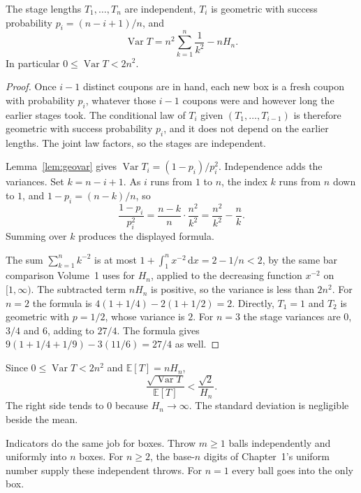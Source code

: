 \begin{proposition}\label{prop:couponvar}
The stage lengths $T_1,\ldots,T_n$ are independent, $T_i$ is geometric with success probability $p_i=(n-i+1)/n$, and
\[
 \operatorname{Var}T=n^2\sum_{k=1}^n\frac1{k^2}-nH_n.
\]
In particular $0\le\operatorname{Var}T<2n^2$.
\end{proposition}
\begin{proof}
Once $i-1$ distinct coupons are in hand, each new box is a fresh coupon with probability $p_i$, whatever those $i-1$ coupons were and however long the earlier stages took. The conditional law of $T_i$ given $(T_1,\ldots,T_{i-1})$ is therefore geometric with success probability $p_i$, and it does not depend on the earlier lengths. The joint law factors, so the stages are independent.

Lemma~\ref{lem:geovar} gives $\operatorname{Var}T_i=(1-p_i)/p_i^2$. Independence adds the variances. Set $k=n-i+1$. As $i$ runs from $1$ to $n$, the index $k$ runs from $n$ down to $1$, and $1-p_i=(n-k)/n$, so
\[
 \frac{1-p_i}{p_i^2}=\frac{n-k}{n}\cdot\frac{n^2}{k^2}=\frac{n^2}{k^2}-\frac nk.
\]
Summing over $k$ produces the displayed formula.

The sum $\sum_{k=1}^n k^{-2}$ is at most $1+\int_1^n x^{-2}\,\mathrm dx=2-1/n<2$, by the same bar comparison Volume~1 uses for $H_n$, applied to the decreasing function $x^{-2}$ on $[1,\infty)$. The subtracted term $nH_n$ is positive, so the variance is less than $2n^2$. For $n=2$ the formula is $4(1+1/4)-2(1+1/2)=2$. Directly, $T_1=1$ and $T_2$ is geometric with $p=1/2$, whose variance is $2$. For $n=3$ the stage variances are $0$, $3/4$ and $6$, adding to $27/4$. The formula gives $9(1+1/4+1/9)-3(11/6)=27/4$ as well.
\end{proof}

Since $0\le\operatorname{Var}T<2n^2$ and $\mathbb E[T]=nH_n$,
\[
 \frac{\sqrt{\operatorname{Var}T}}{\mathbb E[T]}<\frac{\sqrt2}{H_n}.
\]
The right side tends to $0$ because $H_n\to\infty$. The standard deviation is negligible beside the mean.

Indicators do the same job for boxes. Throw $m\ge1$ balls independently and uniformly into $n$ boxes. For $n\ge2$, the base-$n$ digits of Chapter~1's uniform number supply these independent throws. For $n=1$ every ball goes into the only box.

